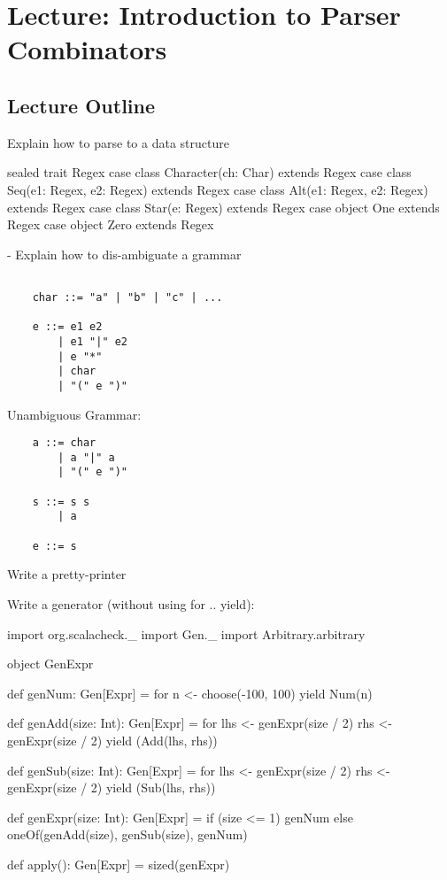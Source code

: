 \chapter{Lecture: Introduction to Parser Combinators}
\startlecture

\begin{instructor}

\section*{Lecture Outline}

Explain how to parse to a data structure

\begin{scalacode}
  sealed trait Regex
  case class Character(ch: Char) extends Regex
  case class Seq(e1: Regex, e2: Regex) extends Regex
  case class Alt(e1: Regex, e2: Regex) extends Regex
  case class Star(e: Regex) extends Regex
  case object One extends Regex
  case object Zero extends Regex
\end{scalacode}

- Explain how to dis-ambiguate a grammar

\begin{verbatim}

    char ::= "a" | "b" | "c" | ...

    e ::= e1 e2
        | e1 "|" e2
        | e "*"
        | char
        | "(" e ")"
\end{verbatim}

Unambiguous Grammar:

\begin{verbatim}
    a ::= char
        | a "|" a
        | "(" e ")"

    s ::= s s
        | a

    e ::= s
\end{verbatim}

Write a pretty-printer


Write a generator (without using for .. yield):

\begin{scalacode}
  import org.scalacheck._
  import Gen._
  import Arbitrary.arbitrary

  object GenExpr {

    def genNum: Gen[Expr] = for {
      n <- choose(-100, 100)
    } yield Num(n)

    def genAdd(size: Int): Gen[Expr] = for {
      lhs <- genExpr(size / 2)
      rhs <- genExpr(size / 2)
    } yield (Add(lhs, rhs))

    def genSub(size: Int): Gen[Expr] = for {
      lhs <- genExpr(size / 2)
      rhs <- genExpr(size / 2)
    } yield (Sub(lhs, rhs))

    def genExpr(size: Int): Gen[Expr] = {
      if (size <= 1) {
        genNum
      }
      else {
        oneOf(genAdd(size), genSub(size), genNum)
      }
    }

    def apply(): Gen[Expr] = sized(genExpr)

  }
\end{scalacode}

\end{instructor}


